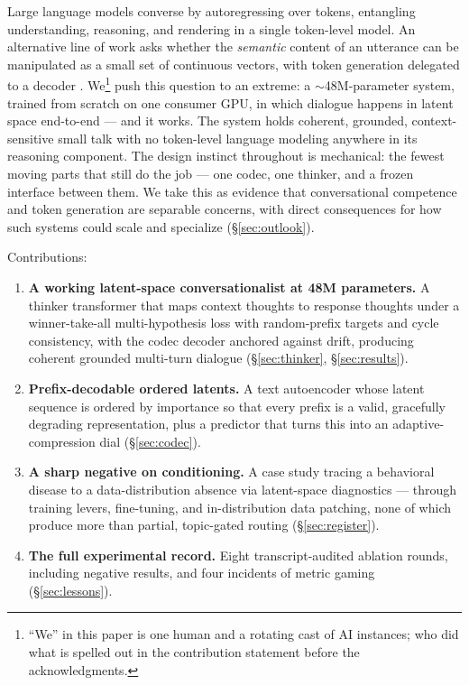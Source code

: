 \documentclass[11pt]{article}
\begin{document}
Large language models converse by autoregressing over tokens, entangling
understanding, reasoning, and rendering in a single token-level model. An
alternative line of work asks whether the \emph{semantic} content of an
utterance can be manipulated as a small set of continuous vectors, with token
generation delegated to a decoder
\citep{lcm2024,hao2024coconut,duquenne2023sonar}. We\footnote{``We'' in this
paper is one human and a rotating cast of AI instances; who did what is
spelled out in the contribution statement before the acknowledgments.} push
this question to an
extreme: a $\sim$48M-parameter system, trained from scratch on one consumer
GPU, in which dialogue happens in latent space end-to-end --- and it works.
The system holds coherent, grounded, context-sensitive small talk with no
token-level language modeling anywhere in its reasoning component. The design
instinct throughout is mechanical: the fewest moving parts that still do the
job --- one codec, one thinker, and a frozen interface between them. We take
this as evidence that conversational competence and token
generation are separable concerns, with direct consequences for how such
systems could scale and specialize (\S\ref{sec:outlook}).

Contributions:
\begin{enumerate}
  \item \textbf{A working latent-space conversationalist at 48M parameters.}
    A thinker transformer that maps context thoughts to response thoughts
    under a winner-take-all multi-hypothesis loss with random-prefix targets
    and cycle consistency, with the codec decoder anchored against drift,
    producing coherent grounded multi-turn dialogue
    (\S\ref{sec:thinker}, \S\ref{sec:results}).
  \item \textbf{Prefix-decodable ordered latents.} A text autoencoder whose
    latent sequence is ordered by importance so that every prefix is a valid,
    gracefully degrading representation, plus a predictor that turns this
    into an adaptive-compression dial (\S\ref{sec:codec}).
  \item \textbf{A sharp negative on conditioning.} A case study tracing a
    behavioral disease to a data-distribution absence via latent-space
    diagnostics --- through training levers, fine-tuning, and
    in-distribution data patching, none of which produce more than partial,
    topic-gated routing (\S\ref{sec:register}).
  \item \textbf{The full experimental record.} Eight transcript-audited
    ablation rounds, including negative results, and four incidents of
    metric gaming (\S\ref{sec:lessons}).
\end{enumerate}
\end{document}
